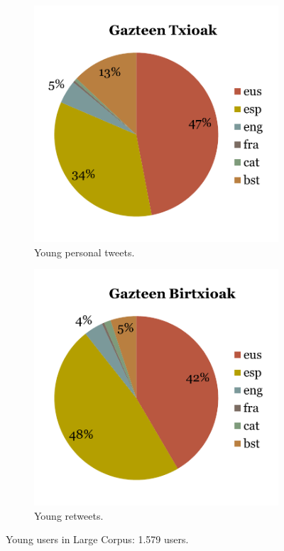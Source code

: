 \documentclass[information,article,submit,moreauthors,pdftex,10pt,a4paper]{Definitions/mdpi}
\begin{document}
\begin{figure}[H]
  \centering
  \begin{subfigure}[b]{0.48\linewidth}
    \includegraphics[width=\linewidth]{txio_gazte}
    \caption{Young personal tweets.}
  \end{subfigure}
  \begin{subfigure}[b]{0.48\linewidth}
    \includegraphics[width=\linewidth]{birtxio_gazte}
    \caption{Young retweets.}
  \end{subfigure}
  \caption{Young users in Large Corpus: 1.579 users.}
  \label{fig:gazte txbtx}
\end{figure}
\end{document}
